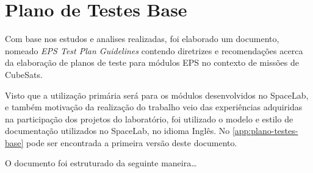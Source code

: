 \chapter{Plano de Testes Base}

Com base nos estudos e analises realizadas, foi elaborado um documento, nomeado \textit{EPS Test Plan Guidelines} contendo diretrizes e recomendações acerca da elaboração de planos de teste para módulos \gls{EPS} no contexto de missões de CubeSats.

Visto que a utilização primária será para os módulos desenvolvidos no SpaceLab, e também motivação da realização do trabalho veio das experiências adquiridas na participação dos projetos do laboratório, foi utilizado o modelo e estilo de documentação utilizados no SpaceLab, no idioma Inglês.
No \autoref{app:plano-testes-base} pode ser encontrada a primeira versão deste documento.

O documento foi estruturado da seguinte maneira\dots